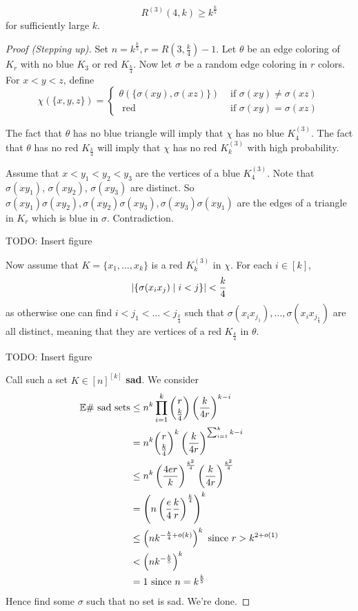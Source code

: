 \documentclass{article}
\begin{document}
\begin{nthm}
  $$R^{(3)}(4, k) \ge k^{\frac k5}$$
  for sufficiently large $k$.
\end{nthm}
\begin{proof}[Proof (Stepping up)]
  Set $n = k^{\frac k5}, r = R(3, \frac k4) - 1$. Let $\theta$ be an edge coloring of $K_r$ with no blue $K_3$ or red $K_{\frac k4}$. Now let $\sigma$ be a random edge coloring in $r$ colors. For $x < y < z$, define
  $$\chi(\{x, y, z\}) =
  \begin{cases}
    \theta(\{\sigma(xy), \sigma(xz)\}) & \text{ if } \sigma(xy) \ne \sigma(xz) \\
    \text{ red} & \text{ if } \sigma(xy) = \sigma(xz)
  \end{cases}$$
  \begin{idea}
    The fact that $\theta$ has no blue triangle will imply that $\chi$ has no blue $K_4^{(3)}$. The fact that $\theta$ has no red $K_{\frac k4}$ will imply that $\chi$ has no red $K_k^{(3)}$ with high probability.
  \end{idea}
  Assume that $x < y_1 < y_2 < y_3$ are the vertices of a blue $K_4^{(3)}$. Note that $\sigma(xy_1)$, $\sigma(xy_2)$, $\sigma(xy_3)$ are distinct. So $\sigma(xy_1)\sigma(xy_2), \sigma(xy_2)\sigma(xy_3), \sigma(xy_3)\sigma(xy_1)$ are the edges of a triangle in $K_r$ which is blue in $\sigma$. Contradiction.
  
  TODO: Insert figure

  Now assume that $K = \{x_1, \dots, x_k\}$ is a red $K_k^{(3)}$ in $\chi$. For each $i \in [k]$,
  $$\left\lvert \{\sigma(x_ix_j) \mid i < j\}\right\rvert < \frac k4$$
  as otherwise one can find $i < j_1 < \dots < j_{\frac k4}$ such that $\sigma(x_ix_{j_1}), \dots, \sigma(x_ix_{j_{\frac k4}})$ are all distinct, meaning that they are vertices of a red $K_{\frac k4}$ in $\theta$.
  
  TODO: Insert figure

  Call such a set $K \in [n]^{[k]}$ {\bf sad}. We consider
  \begin{align*}
    \mathbb E \#\text{ sad sets}
    & \le n^k \prod_{i = 1}^k \binom r{\frac k4} \left(\frac k{4r}\right)^{k - i} \\
    & = n^k \binom r{\frac k4}^k \left(\frac k{4r}\right)^{\sum_{i = 1}^k k - i} \\
    & \le n^k \left(\frac{4er}k\right)^{\frac{k^2}4} \left(\frac k{4r}\right)^{\frac{k^2}4} \\
    & = \left(n\left(\frac e4 \frac kr\right)^{\frac k4}\right)^k \\
    & \le \left(nk^{-\frac k4 + o(k)}\right)^k \text{ since } r > k^{2 + o(1)} \\
    & < \left(nk^{-\frac k5}\right)^k \\
    & = 1 \text{ since } n = k^{\frac k5}
  \end{align*}
  Hence find some $\sigma$ such that no set is sad. We're done.
\end{proof}

\newlec

\printindex
\end{document}
